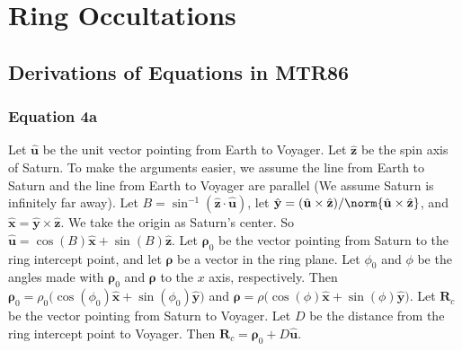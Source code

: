 \documentclass[crop=false,class=article,oneside]{standalone}
\begin{document}
    \ifx\ifresearchnotesosthemathematicsofcassini\undefined
        \section*{Ring Occultations}
        \setcounter{section}{1}
        \renewcommand\thesubfigure{%
            \arabic{section}.\arabic{figure}.\arabic{subfigure}%
        }
    \fi
    \subsection{Derivations of Equations in MTR86}
        \subsubsection{Equation 4a}
            Let $\hat{\mathbf{u}}$ be the unit
            vector pointing from Earth to Voyager.
            Let $\hat{\mathbf{z}}$ be the spin axis of
            Saturn. To make the arguments easier,
            we assume the line from Earth to Saturn
            and the line from Earth to Voyager are
            parallel (We assume Saturn is infinitely far away).
            Let
            $B=\sin^{-1}(\hat{\mathbf{z}}\cdot \hat{\mathbf{u}})$,
            let
            $\hat{\mathbf{y}}%
             =(\hat{\mathbf{u}}\times%
              \hat{\mathbf{z}})/%
              \norm{\hat{\mathbf{u}}\times%
              \hat{\mathbf{z}}}$,
            and
            $\hat{\mathbf{x}}%
             =\hat{\mathbf{y}}\times \hat{\mathbf{z}}$.
            We take the origin as Saturn's center. So
            $\hat{\mathbf{u}}%
             =\cos(B)\hat{\mathbf{x}}+\sin(B)\hat{\mathbf{z}}$.
            Let $\boldsymbol{\rho}_{0}$ be the vector pointing
            from Saturn to the ring intercept point,
            and let $\boldsymbol{\rho}$ be a vector in
            the ring plane. Let $\phi_{0}$ and
            $\phi$ be the angles made with
            $\boldsymbol{\rho}_{0}$ and $\boldsymbol{\rho}$
            to the $x$ axis, respectively. Then
            $\boldsymbol{\rho}_{0}%
             =\rho_{0}\big(\cos(\phi_0)\hat{\mathbf{x}}+%
              \sin(\phi_{0})\hat{\mathbf{y}}\big)$
            and
            $\boldsymbol{\rho}%
             =\rho\big(\cos(\phi)\hat{\mathbf{x}}+%
              \sin(\phi)\hat{\mathbf{y}}\big)$.
            Let $\mathbf{R}_{c}$ be the vector pointing
            from Saturn to Voyager. Let $D$ be the
            distance from the ring intercept point
            to Voyager. Then
            $\mathbf{R}_{c}%
             =\boldsymbol{\rho}_{0}+D\hat{\mathbf{u}}$.
\end{document}

